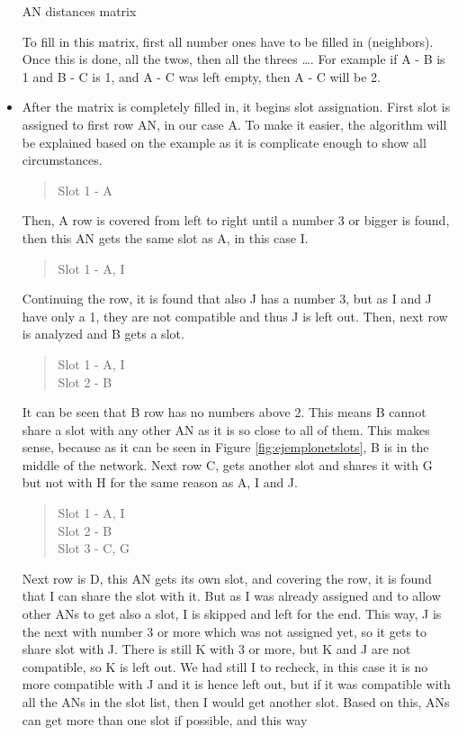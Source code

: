 \begin{itemize}
\begin{table}
\begin{center}
  \caption{\ac{AN} distances matrix}
  \label{tab:neighborsmatrix}
 \end{center}
\end{table}
To fill in this matrix, first all number ones have to be filled in (neighbors). Once this is done, all the twos, then all the threes \ldots. For 
example if A - B is 1 and B - C is 1, and A - C was left empty, then A - C will be 2.
 \item After the matrix is completely filled in, it begins slot assignation. First slot is assigned to first row \ac{AN}, in our case A. To 
make it easier, the algorithm will be explained based on the example as it is complicate enough to show all circumstances.
\begin{quote}
 Slot 1 - A
\end{quote}
Then, A row is covered from left to right until a number 3 or bigger is found, then this \ac{AN} gets the same slot as A, in this case I.
\begin{quote}
 Slot 1 - A, I
\end{quote}
Continuing the row, it is found that also J has a number 3, but as I and J have only a 1, they are not compatible and thus J is left out. 
Then, next row is analyzed and B gets a slot.
\begin{quote}
 Slot 1 - A, I \\ Slot 2 - B
\end{quote}
It can be seen that B row has no numbers above 2. This means B cannot share a slot with any other \ac{AN} as it is so close to all of them. 
This makes sense, because as it can be seen in Figure \ref{fig:ejemplonetslots}, B is in the middle of the network. Next row C, gets another
slot and shares it with G but not with H for the same reason as A, I and J.
\begin{quote}
 Slot 1 - A, I \\ Slot 2 - B \\ Slot 3 - C, G
\end{quote}
Next row is D, this \ac{AN} gets its own slot, and covering the row, it is found that I can share the slot with it. But as I was already 
assigned and to allow other \acp{AN} to get also a slot, I is skipped and left for the end. This way, J is the next with number 3 or more 
which was not assigned yet, so it gets to share slot with J. There is still K with 3 or more, but K and J are not compatible, so K is left out.
We had still I to recheck, in this case it is no more compatible with J and it is hence left out, but if it was compatible with all the 
\acp{AN} in the slot list, then I would get another slot. Based on this, \acp{AN} can get more than one slot if possible, and this way 

\end{itemize}
